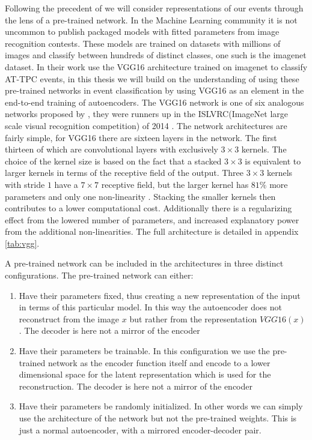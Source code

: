 Following the precedent of  \cite{Kuchera2019} we will consider representations of our events through the lens of a pre-trained network. In the Machine Learning community it is not uncommon to publish packaged models with fitted parameters from image recognition contests. These models are trained on datasets with millions of images and classify between hundreds of distinct classes, one such is the imagenet dataset. In their work \cite{Kuchera2019} use the VGG16 architecture trained on imagenet to classify AT-TPC events, in this thesis we will build on the understanding of using these pre-trained networks in event classification by using VGG16 as an element in the end-to-end training of autoencoders. The VGG16 network is  one of six analogous networks proposed by \citet{Simonyan2014}, they were runners up in the ISLVRC(ImageNet large scale visual recognition competition) of 2014 \cite{Russakovsky2015}. The network architectures are fairly simple, for VGG16 there are sixteen layers in the network. The first thirteen of which are convolutional layers with exclusively $3 \times 3$ kernels. The choice of the kernel size  is based on the fact that a stacked $3 \times 3$ is equivalent to larger kernels in terms of the receptive field of the output. Three $3 \times 3$ kernels with stride $1$ have a $7 \times 7$ receptive field, but the larger kernel has $81\%$ more parameters and only one non-linearity \cite{Simonyan2014}. Stacking the smaller kernels then contributes to a lower computational cost. Additionally there is a regularizing effect from the lowered number of parameters, and increased explanatory power from the additional non-linearities. The full architecture is detailed in appendix \ref{tab:vgg}.

A pre-trained network can be included in the architectures in three distinct configurations. The pre-trained network can either:

\begin{enumerate}
\item Have their parameters fixed, thus creating a new representation of the input in terms of this particular model. In this way the autoencoder does not reconstruct from the image $x$ but rather from the representation $VGG16(x)$. The decoder is here not a mirror of the encoder
\item Have their parameters be trainable. In this configuration we use the pre-trained network as the encoder function itself and encode to a lower dimensional space for the latent representation which is used for the reconstruction. The decoder is here not a mirror  of the encoder
\item Have their parameters be randomly initialized. In other words we can simply use the architecture of  the network but not the pre-trained weights. This is just a normal autoencoder, with a mirrored encoder-decoder pair. 
\end{enumerate}

